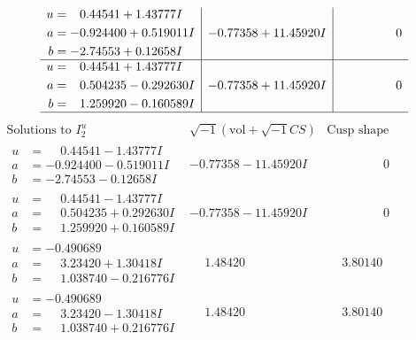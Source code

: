 \documentclass[1p]{elsarticle_modified}
\theoremstyle{definition}
\newcommand{\I}{\sqrt{-1}}
\begin{document}
$$\begin{array}{c|c|c}
\begin{aligned}
u &= \phantom{-}0.44541 + 1.43777 I \\
a &= -0.924400 + 0.519011 I \\
b &= -2.74553 + 0.12658 I\end{aligned}
 & -0.77358 + 11.45920 I & \phantom{-0.000000 } 0 \\ \hline\begin{aligned}
u &= \phantom{-}0.44541 + 1.43777 I \\
a &= \phantom{-}0.504235 - 0.292630 I \\
b &= \phantom{-}1.259920 - 0.160589 I\end{aligned}
 & -0.77358 + 11.45920 I & \phantom{-0.000000 } 0\\
 \hline 
 \end{array}$$\newpage$$\begin{array}{c|c|c}  
\text{Solutions to }I^u_{2}& \I (\text{vol} + \sqrt{-1}CS) & \text{Cusp shape}\\
 \hline 
\begin{aligned}
u &= \phantom{-}0.44541 - 1.43777 I \\
a &= -0.924400 - 0.519011 I \\
b &= -2.74553 - 0.12658 I\end{aligned}
 & -0.77358 - 11.45920 I & \phantom{-0.000000 } 0 \\ \hline\begin{aligned}
u &= \phantom{-}0.44541 - 1.43777 I \\
a &= \phantom{-}0.504235 + 0.292630 I \\
b &= \phantom{-}1.259920 + 0.160589 I\end{aligned}
 & -0.77358 - 11.45920 I & \phantom{-0.000000 } 0 \\ \hline\begin{aligned}
u &= -0.490689\phantom{ +0.000000I} \\
a &= \phantom{-}3.23420 + 1.30418 I \\
b &= \phantom{-}1.038740 - 0.216776 I\end{aligned}
 & \phantom{-}1.48420\phantom{ +0.000000I} & \phantom{-}3.80140\phantom{ +0.000000I} \\ \hline\begin{aligned}
u &= -0.490689\phantom{ +0.000000I} \\
a &= \phantom{-}3.23420 - 1.30418 I \\
b &= \phantom{-}1.038740 + 0.216776 I\end{aligned}
 & \phantom{-}1.48420\phantom{ +0.000000I} & \phantom{-}3.80140\phantom{ +0.000000I} \\ \hline\begin{aligned}

\end{aligned}
\end{array}$$
\end{document}

